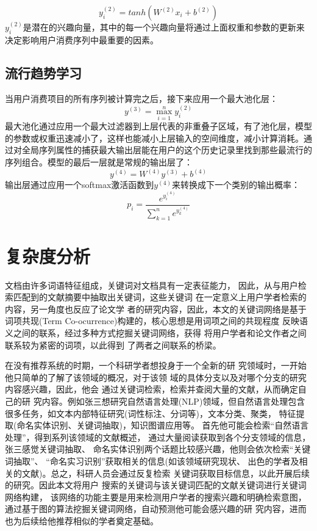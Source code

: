$$
y_{i}^{(2)}=tanh(W^{(2)}x_{i}+b^{(2)})
$$
$y_{i}^{(2)}$是潜在的兴趣向量，其中的每一个兴趣向量将通过上面权重和参数的更新来决定影响用户消费序列中最重要的因素。

\subsection{流行趋势学习}
当用户消费项目的所有序列被计算完之后，接下来应用一个最大池化层：
$$
y^{(3)}=\max_{i=1}^{n}y_{i}^{(2)}
$$
最大池化通过应用一个最大过滤器到上层代表的非重叠子区域，有了池化层，模型的参数或权重迅速减小了，这样也能减小上层输入的空间维度，减小计算消耗。通过对全局序列属性的捕获最大输出层能在用户的这个历史记录里找到那些最流行的序列组合。模型的最后一层就是常规的输出层了：
$$
y^{(4)}=W^{(4)}y^{(3)}+b^{(4)}
$$
输出层通过应用一个softmax激活函数到$y^{(4)}$来转换成下一个类别的输出概率：
$$
p_{i}= \frac{e^{y_{i}^{(4)}}}{\sum_{k=1}^{n}e^{y_{k}^{(4)}}}
$$



\section{复杂度分析}
文档由许多词语特征组成，关键词对文档具有一定表征能力，%
因此，从与用户检索匹配到的文献摘要中抽取出关键词，这些关键词%
在一定意义上用户学者检索的内容，另一角度也反应了论文学%
者的研究内容，因此，本文的关键词网络是基于词项共现(Term Co-ocurrence)构建的，核心思想是用词项之间的共现程度%
反映语义之间的联系，经过多种方式挖掘关键词网络，获得%
将用户学者和论文作者之间联系较为紧密的词项，以此得到%
了两者之间联系的桥梁。

在没有推荐系统的时期，一个科研学者想投身于一个全新的研%
究领域时，一开始他只简单的了解了该领域的概况，对于该领%
域的具体分支以及对哪个分支的研究内容感兴趣，因此，他会%
通过关键词检索，检索并查阅大量的文献，从而确定自己的研%
究内容。例如张三想研究自然语言处理(NLP)领域，但自然语言处理包含很多任务，如文本内部特征研究(词性标注、分词等)，文本分类、聚类，%
特征提取(命名实体识别、关键词抽取)，知识图谱应用等。%
首先他可能会检索“自然语言处理”，得到系列该领域的文献概述，%
通过大量阅读获取到各个分支领域的信息，张三感觉关键词抽取、%
命名实体识别两个话题比较感兴趣，他则会依次检索“关键词抽取”、%
“命名实习识别”获取相关的信息(如该领域研究现状、%
出色的学者及相关的文献)。总之，科研人员会通过反复检索%
关键词获取目标信息，以此开展后续的研究。因此本文将用户%
搜索的关键词与该关键词匹配的文献关键词进行关键词网络构建，%
该网络的功能主要是用来检测用户学者的搜索兴趣和明确检索意图，%
通过基于图的算法挖掘关键词网络，自动预测他可能会感兴趣的研%
究内容，进而也为后续给他推荐相似的学者奠定基础。

